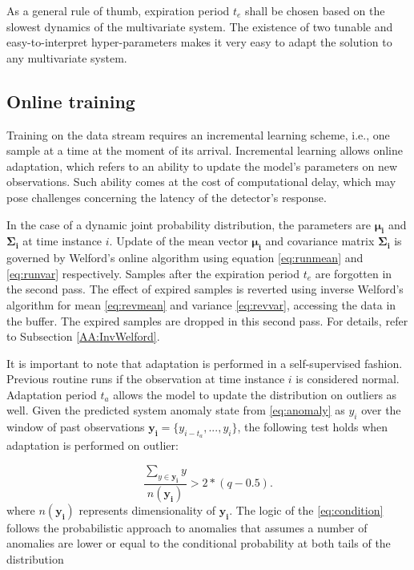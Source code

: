As a general rule of thumb, expiration period $t_e$ shall be chosen based on the slowest dynamics of the multivariate system. The existence of two tunable and easy-to-interpret hyper-parameters makes it very easy to adapt the solution to any multivariate system.

\subsection{Online training}\label{train}
Training on the data stream requires an incremental learning scheme, i.e., one sample at a time at the moment of its arrival. Incremental learning allows online adaptation, which refers to an ability to update the model's parameters on new observations. Such ability comes at the cost of computational delay, which may pose challenges concerning the latency of the detector's response.

In the case of a dynamic joint probability distribution, the parameters are $\boldsymbol{\mu_i}$ and $\boldsymbol{\Sigma_i}$ at time instance \(i\). Update of the mean vector $\boldsymbol{\mu_i}$ and covariance matrix $\boldsymbol{\Sigma_i}$ is governed by Welford's online algorithm using equation \eqref{eq:runmean} and \eqref{eq:runvar} respectively. Samples after the expiration period $t_e$ are forgotten in the second pass. The effect of expired samples is reverted using inverse Welford's algorithm for mean \eqref{eq:revmean} and variance \eqref{eq:revvar}, accessing the data in the buffer. The expired samples are dropped in this second pass. For details, refer to Subsection \ref{AA:InvWelford}.

It is important to note that adaptation is performed in a self-supervised fashion. Previous routine runs if the observation at time instance \(i\) is considered normal. Adaptation period $t_a$ allows the model to update the distribution on outliers as well. Given the predicted system anomaly state from \eqref{eq:anomaly} as $y_i$  over the window of past observations \(\boldsymbol{y_i}=\{y_{i-t_a},...,y_{i}\}\), the following test holds when adaptation is performed on outlier:

\begin{equation}
{\frac{\sum_{y\in \boldsymbol{y_i}}y}{n(\boldsymbol{y_i})}} > 2*(q-0.5)\text{.}\label{eq:condition}
\end{equation}
where \(n(\boldsymbol{y_i})\) represents dimensionality of \(\boldsymbol{y_i}\). The logic of the \eqref{eq:condition} follows the probabilistic approach to anomalies that assumes a number of anomalies are lower or equal to the conditional probability at both tails of the distribution

